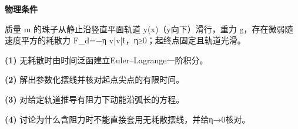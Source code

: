 \textbf{物理条件}\par 质量 m 的珠子从静止沿竖直平面轨道 y(x)（y向下）滑行，重力 g，存在微弱随速度平方的耗散力 F\_d=−η v|v|t̂，η≥0；起终点固定且轨道光滑。
\par\noindent\textbf{(1)} 无耗散时由时间泛函建立Euler–Lagrange一阶积分。
\par\noindent\textbf{(2)} 解出参数化摆线并核对起点尖点的有限时间。
\par\noindent\textbf{(3)} 对给定轨道推导有阻力下动能沿弧长的方程。
\par\noindent\textbf{(4)} 讨论为什么含阻力时不能直接套用无耗散摆线，并给η→0核对。
